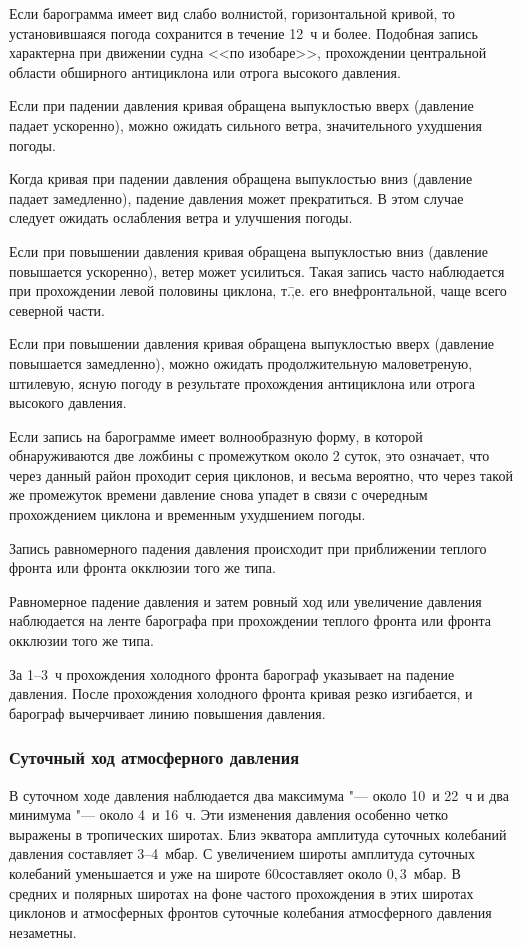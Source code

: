  Если барограмма имеет вид слабо волнистой, горизонтальной
кривой, то установившаяся погода сохранится в течение 12~ч и
более. Подобная запись характерна при движении судна <<по изобаре>>,
прохождении центральной области обширного антициклона или отрога
высокого давления.

 Если при падении давления кривая обращена выпуклостью вверх
(давление падает ускоренно), можно ожидать сильного ветра,
значительного ухудшения погоды.

 Когда кривая при падении давления обращена выпуклостью вниз
(давление падает замедленно), падение давления может прекратиться. В
этом случае следует ожидать ослабления ветра и улучшения погоды.

 Если при повышении давления кривая обращена выпуклостью вниз
(давление повышается ускоренно), ветер может усилиться. Такая запись
часто наблюдается при прохождении левой половины циклона, т.\=,е. его
внефронтальной, чаще всего северной части.

 Если при повышении давления кривая обращена выпуклостью вверх
(давление повышается замедленно), можно ожидать продолжительную
маловетреную, штилевую, ясную погоду в результате прохождения
антициклона или отрога высокого давления.

 Если запись на барограмме имеет волнообразную форму, в которой
обнаруживаются две ложбины с промежутком около 2 суток, это означает,
что через данный район проходит серия циклонов, и весьма вероятно, что
через такой же промежуток времени давление снова упадет в связи с
очередным прохождением циклона и временным ухудшением погоды.

 Запись равномерного падения давления происходит при
приближении теплого фронта или фронта окклюзии того же типа.

 Равномерное падение давления и затем ровный ход или увеличение
давления наблюдается на ленте барографа при прохождении теплого фронта
или фронта окклюзии того же типа.

 За 1--3~ч прохождения холодного фронта барограф указывает на
падение давления. После прохождения холодного фронта кривая резко
изгибается, и барограф вычерчивает линию повышения давления.

\subsubsection{Суточный ход атмосферного давления}

В суточном ходе давления наблюдается два максимума "--- около 10~и 22~ч и
два минимума "--- около 4~и 16~ч. Эти изменения давления особенно четко
выражены в тропических широтах. Близ экватора амплитуда суточных
колебаний давления составляет 3--4~мбар. С увеличением широты амплитуда
суточных колебаний уменьшается и уже на широте 60\gr составляет около
$0,3$~мбар. В средних и полярных широтах на фоне частого прохождения в
этих широтах циклонов и атмосферных фронтов суточные колебания
атмосферного давления незаметны.

